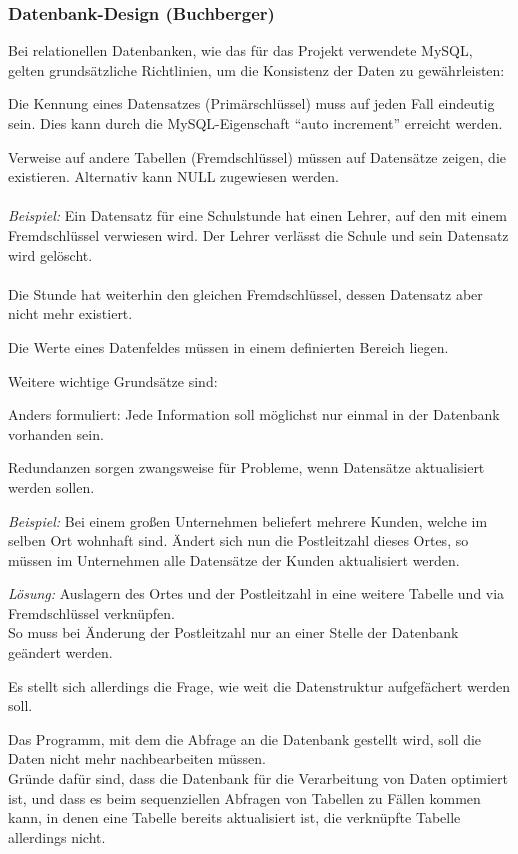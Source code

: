\subsubsection{Datenbank-Design (Buchberger)}

Bei relationellen Datenbanken, wie das für das Projekt verwendete MySQL, gelten grundsätzliche Richtlinien, um die Konsistenz der Daten zu gewährleisten:

\begin{description}[style=nextline]
	\item[Entitätsintegrität]
		Die Kennung eines Datensatzes (Primärschlüssel) muss auf jeden Fall eindeutig sein. Dies kann durch die MySQL-Eigenschaft \enquote{auto increment} erreicht werden.
	\item[Referenzielle Integrität]
		Verweise auf andere Tabellen (Fremdschlüssel) müssen auf Datensätze zeigen, die existieren. Alternativ kann NULL zugewiesen werden.\\
		\\
		\textit{Beispiel:} Ein Datensatz für eine Schulstunde hat einen Lehrer, auf den mit einem Fremdschlüssel verwiesen wird. Der Lehrer verlässt die Schule und sein Datensatz wird gelöscht.\\
		\\
		Die Stunde hat weiterhin den gleichen Fremdschlüssel, dessen Datensatz aber nicht mehr existiert.
	\item[Bereichsintegrität]
		Die Werte eines Datenfeldes müssen in einem definierten Bereich liegen.
\end{description}

Weitere wichtige Grundsätze sind:

\begin{description}[style=nextline]
	\item[Redundanzen sind zu vermeiden]
		Anders formuliert: Jede Information soll möglichst nur einmal in der Datenbank vorhanden sein.
		
		Redundanzen sorgen zwangsweise für Probleme, wenn Datensätze aktualisiert werden sollen.
		
		\textit{Beispiel:} Bei einem großen Unternehmen beliefert mehrere Kunden, welche im selben Ort wohnhaft sind. Ändert sich nun die Postleitzahl dieses Ortes, so müssen im Unternehmen alle Datensätze der Kunden aktualisiert werden.
		
		\textit{Lösung:} Auslagern des Ortes und der Postleitzahl in eine weitere Tabelle und via Fremdschlüssel verknüpfen.\\
		So muss bei Änderung der Postleitzahl nur an einer Stelle der Datenbank geändert werden.
		
		Es stellt sich allerdings die Frage, wie weit die Datenstruktur aufgefächert werden soll.
	\item[Gerechnet wird von der Datenbank]
		Das Programm, mit dem die Abfrage an die Datenbank gestellt wird, soll die Daten nicht mehr nachbearbeiten müssen.\\
		Gründe dafür sind, dass die Datenbank für die Verarbeitung von Daten optimiert ist, und dass es beim sequenziellen Abfragen von Tabellen zu Fällen kommen kann, in denen eine Tabelle bereits aktualisiert ist, die verknüpfte Tabelle allerdings nicht.
\end{description}
